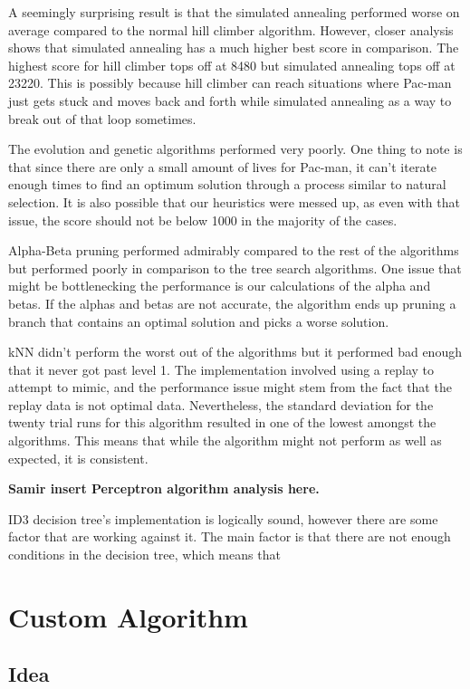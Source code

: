 \documentclass[a4paper,oneside,10pt]{report}
\begin{document}
A seemingly surprising result is that the simulated annealing performed worse on average compared to the normal hill climber algorithm. However, closer analysis shows that simulated annealing has a much higher best score in comparison. The highest score for hill climber tops off at 8480 but simulated annealing tops off at 23220. This is possibly because hill climber can reach situations where Pac-man just gets stuck and moves back and forth while simulated annealing as a way to break out of that loop sometimes. 

The evolution and genetic algorithms performed very poorly. One thing to note is that since there are only a small amount of lives for Pac-man, it can't iterate enough times to find an optimum solution through a process similar to natural selection. It is also possible that our heuristics were messed up, as even with that issue, the score should not be below 1000 in the majority of the cases.

Alpha-Beta pruning performed admirably compared to the rest of the algorithms but performed poorly in comparison to the tree search algorithms. One issue that might be bottlenecking the performance is our calculations of the alpha and betas. If the alphas and betas are not accurate, the algorithm ends up pruning a branch that contains an optimal solution and picks a worse solution.

kNN didn't perform the worst out of the algorithms but it performed bad enough that it never got past level 1. The implementation involved using a replay to attempt to mimic, and the performance issue might stem from the fact that the replay data is not optimal data. Nevertheless, the standard deviation for the twenty trial runs for this algorithm resulted in one of the lowest amongst the algorithms. This means that while the algorithm might not perform as well as expected, it is consistent.


\textbf{Samir insert Perceptron algorithm analysis here.}

ID3 decision tree's implementation is logically sound, however there are some factor that are working against it. The main factor is that there are not enough conditions in the decision tree, which means that

\chapter{Custom Algorithm} \label{custom}

\section {Idea} \label{custIdea}
\end{document}
